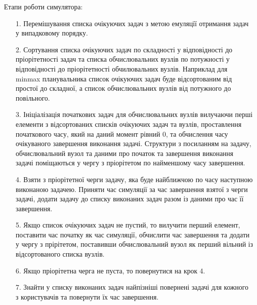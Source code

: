 Етапи роботи симулятора:
\begin{itemize}
	\item[1.] Перемішування списка очікуючих задач з метою емуляцїї отримання задач у випадковому порядку.
	
	\item[2.] Сортування списка очікуючих задач по складності у відповідності до пріорітетності задач та списка обчислювальних вузлів по потужності у відповідності до пріорітетності обчилювальних вузлів. Наприклад для minmax планувальника список очікуючих задач буде відсортованим від простої до складної, а список обчислювальних вузлів від потужного до повільного.
	
	\item[3.] Ініціалізація початкових задач для обчислювальних вузлів вилучаючи перші елементи з  відсортованих списків очікуючих задач та вузлів, проставлення початкового часу, який на даний момент рівний 0, та обчислення часу очікуваного завершення виконання задачі. Структури з посиланням на задачу, обчислювальний вузол та даними про початок та завершення виконання задачі поміщаються у чергу з пріорітетом по найменшому часу завершення.
	
	\item[4.] Взяти з пріорітетної черги задачу, яка буде найближчою по часу наступною виконаною задачею. Приняти час симуляції за час завершення взятої з черги задачі, додати задачу до списку виконаних задач разом із даними про час її завершення.
	
	\item[5.] Якщо список очікуючих задач не пустий, то вилучити перший елемент, поставити час початку як час симуляції, обчислити час завершення та додати у чергу з прірітетом, поставивши обчислювальний вузол як перший вільний із відсортованого списка вузлів.
	
	\item[6.] Якщо пріорітетна черга не пуста, то повернутися на крок 4.
	
	\item[7.] Знайти у списку виконаних задач найпізніші повернені задачі для кожного з користувачів та повернути їх час завершення.
\end{itemize}

